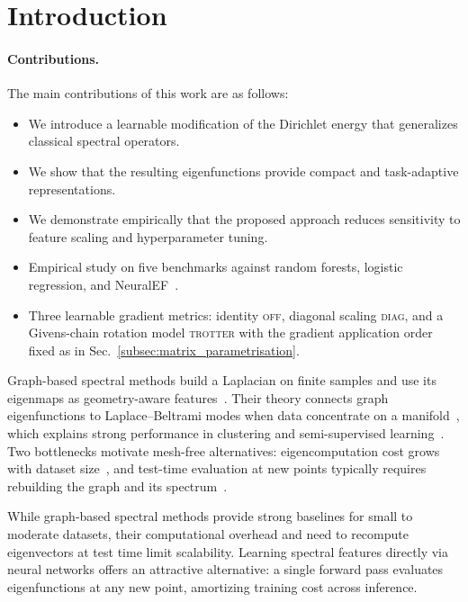 \documentclass{article}
\theoremstyle{plain}
\theoremstyle{definition}
\theoremstyle{remark}
\newcommand{\new}[1]{#1}
\begin{document}
\section{Introduction}

\paragraph{Contributions.}
The main contributions of this work are as follows:
\begin{itemize}
\item We introduce a learnable modification of the Dirichlet energy that generalizes classical spectral operators.
\item We show that the resulting eigenfunctions provide compact and task-adaptive representations.
\item We demonstrate empirically that the proposed approach reduces sensitivity to feature scaling and hyperparameter tuning.
\new{\item Empirical study on five benchmarks against random forests, logistic regression, and NeuralEF~\citep{pmlr-v162-deng22b}.
\item Three learnable gradient metrics: identity \textsc{off}, diagonal scaling \textsc{diag}, and a Givens-chain rotation model \textsc{trotter} with the gradient application order fixed as in Sec.~\ref{subsec:matrix_parametrisation}.}
\end{itemize}

\label{sec:introduction}
Graph-based spectral methods build a Laplacian on finite samples and use its eigenmaps as geometry-aware features~\citep{4476091,10.1137/1.9781611972801.49}.
Their theory connects graph eigenfunctions to Laplace--Beltrami modes when data concentrate on a manifold~\citep{BELKIN20081289}, which explains strong performance in clustering and semi-supervised learning~\citep{NIPS2001_801272ee}.
Two bottlenecks motivate mesh-free alternatives: eigencomputation cost grows with dataset size~\citep{FORD201579}, and test-time evaluation at new points typically requires rebuilding the graph and its spectrum~\citep{BELKIN20081289}.

\new{While graph-based spectral methods provide strong baselines for small to moderate datasets, their computational overhead and need to recompute eigenvectors at test time limit scalability. Learning spectral features directly via neural networks offers an attractive alternative: a single forward pass evaluates eigenfunctions at any new point, amortizing training cost across inference.}
\end{document}
